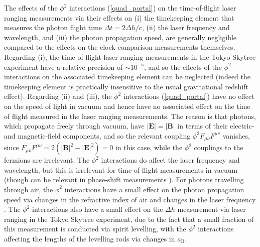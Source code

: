 \documentclass[aps,prd,onecolumn,nofootinbib]{revtex4-2} %
\renewcommand{\v}[1]{\boldsymbol{#1}}		%
\begin{document}
The effects of the $\phi^2$ interactions (\ref{quad_portal}) on the time-of-flight laser ranging measurements via their effects on (i) the timekeeping element that measures the photon flight time $\Delta t = 2 \Delta h / c$, (ii) the laser frequency and wavelength, and (iii) the photon propagation speed, are generally negligible compared to the effects on the clock comparison measurements themselves. 
Regarding (i), the time-of-flight laser ranging measurements in the Tokyo Skytree experiment have a relative precision of $\sim 10^{-5}$, and so the effects of the $\phi^2$ interactions on the associated timekeeping element can be neglected (indeed the timekeeping element is practically insensitive to the usual gravitational redshift effect). 
Regarding (ii) and (iii), the $\phi^2$ interactions (\ref{quad_portal}) have no effect on the speed of light in vacuum and hence have no associated effect on the time of flight measured in the laser ranging measurements. 
The reason is that photons, which propagate freely through vacuum, have $|\v{E}| = |\v{B}|$ in terms of their electric- and magnetic-field components, and so the relevant coupling $\phi^2 F_{\mu \nu} F^{\mu \nu}$ vanishes, since $F_{\mu \nu} F^{\mu \nu} = 2 (|\v{B}|^2 - |\v{E}|^2) = 0$ in this case, while the $\phi^2$ couplings to the fermions are irrelevant. 
The $\phi^2$ interactions do affect the laser frequency and wavelength, but this is irrelevant for time-of-flight measurements in vacuum (though can be relevant in phase-shift measurements \cite{Stadnik_2019_DM-LIFO}). 
For photons travelling through air, the $\phi^2$ interactions have a small effect on the photon propagation speed via changes in the refractive index of air and changes in the laser frequency \cite{Stadnik_2019_DM-LIFO}. 
The $\phi^2$ interactions also have a small effect on the $\Delta h$ measurement via laser ranging in the Tokyo Skytree experiment, due to the fact that a small fraction of this measurement is conducted via spirit levelling, with the $\phi^2$ interactions affecting the lengths of the levelling rods via changes in $a_\textrm{B}$. 
\end{document}
